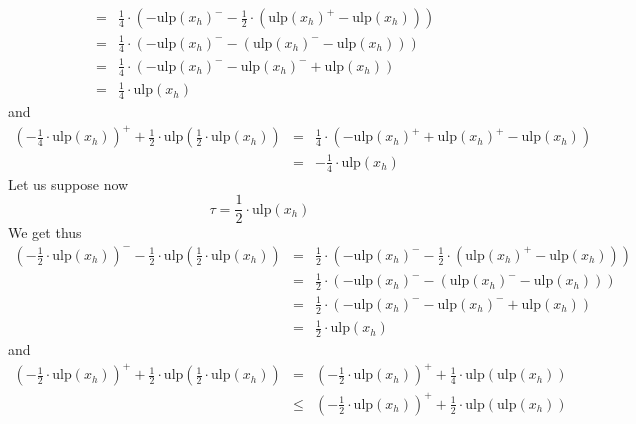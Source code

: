 \documentclass[a4paper,10pt,twoside]{article}
\newenvironment{proof}[1][Proof]{\begin{trivlist}
\item[\hskip \labelsep {\bfseries #1}]}{\end{trivlist}}
\newcommand{\hi}{\ensuremath{\mathit{h}}}
\newcommand{\mUlp}{\ensuremath{\mathrm{ulp}}}
\begin{document}
\begin{proof}
\begin{eqnarray*}
& = & \frac{1}{4} \cdot \left( - \mUlp\left( x_\hi \right)^- - \frac{1}{2} \cdot \left(  \mUlp\left( x_\hi \right)^+
-  \mUlp\left( x_\hi \right)  \right) \right) \\
& = & \frac{1}{4} \cdot \left( - \mUlp\left( x_\hi \right)^- - \left(  \mUlp\left( x_\hi \right)^- -  \mUlp\left( x_\hi \right)  \right) \right) \\
& = & \frac{1}{4} \cdot \left( - \mUlp\left( x_\hi \right)^- -  \mUlp\left( x_\hi \right)^- +  \mUlp\left( x_\hi \right)  \right) \\
& = & \frac{1}{4} \cdot  \mUlp\left( x_\hi \right)
\end{eqnarray*}
and
\begin{eqnarray*}
\left( - \frac{1}{4} \cdot  \mUlp\left( x_\hi \right)  \right)^+ + \frac{1}{2} \cdot \mUlp\left( \frac{1}{2} \cdot  \mUlp\left( x_\hi \right)  \right)
& = & \frac{1}{4} \cdot \left( - \mUlp\left( x_\hi \right)^+ +  \mUlp\left( x_\hi \right)^+ -  \mUlp\left( x_\hi \right)  \right) \\
& = & - \frac{1}{4} \cdot  \mUlp\left( x_\hi \right)
\end{eqnarray*}
Let us suppose now
$$\tau = \frac{1}{2} \cdot \mUlp \left( x_\hi \right) $$
We get thus
\begin{eqnarray*}
\left( - \frac{1}{2} \cdot  \mUlp\left( x_\hi \right)  \right)^- - \frac{1}{2} \cdot \mUlp\left( \frac{1}{2} \cdot  \mUlp\left( x_\hi \right)  \right)
& = & \frac{1}{2} \cdot \left( - \mUlp\left( x_\hi \right)^- - \frac{1}{2} \cdot \left(  \mUlp\left( x_\hi \right)^+
-  \mUlp\left( x_\hi \right)  \right) \right) \\
& = & \frac{1}{2} \cdot \left( - \mUlp\left( x_\hi \right)^- - \left(  \mUlp\left( x_\hi \right)^- -  \mUlp\left( x_\hi \right)  \right) \right) \\
& = & \frac{1}{2} \cdot \left( - \mUlp\left( x_\hi \right)^- -  \mUlp\left( x_\hi \right)^- +  \mUlp\left( x_\hi \right)  \right) \\
& = & \frac{1}{2} \cdot  \mUlp\left( x_\hi \right)
\end{eqnarray*}
and
\begin{eqnarray*}
\left( - \frac{1}{2} \cdot  \mUlp\left( x_\hi \right)  \right)^+ + \frac{1}{2} \cdot \mUlp\left( \frac{1}{2} \cdot  \mUlp\left( x_\hi \right)  \right)
& = & \left(- \frac{1}{2} \cdot  \mUlp\left( x_\hi \right) \right)^+ + \frac{1}{4} \cdot \mUlp\left(  \mUlp\left( x_\hi \right)  \right) \\
& \leq & \left(- \frac{1}{2} \cdot  \mUlp\left( x_\hi \right) \right)^+ + \frac{1}{2} \cdot \mUlp\left(  \mUlp\left( x_\hi \right)  \right) \\

\end{eqnarray*}
\end{proof}
\end{document}
